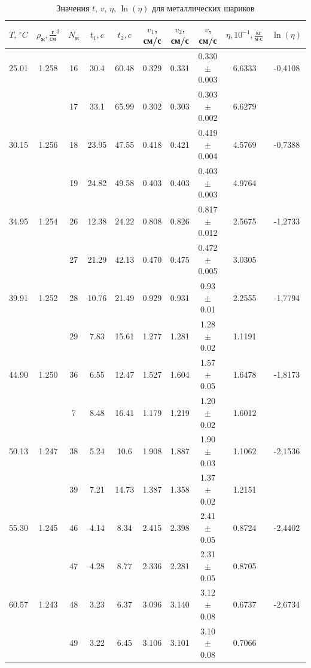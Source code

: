 \documentclass[a4paper,12pt]{article} %
\begin{document}
\begin{enumerate}
	\begin{table}[h!]
		\centering
		\begin{tabular}{|c|c|c|cc|cc|c|c|c|}
			\hline
			$T, \, ^\circ C$ & $\rho_\text{ж}, \frac{\text{г}}{\text{см}}^3$ & $N_{\text{м}}$ & $t_1, c$ & $t_2, c$ & $v_1$, см/с & $v_2$, см/с & $v$, см/с & $\eta, 10^{-1}, \frac{\text{кг}}{\text{м·с}}$ & $\ln(\eta)$ \\
			\hline
			25.01 & 1.258 & 16 & 30.4  & 60.48 & 0.329  & 0.331  & 0.330 $\pm$ 0.003 & 6.6333 & -0,4108 \\
						&      & 17 & 33.1  & 65.99 & 0.302  & 0.303  & 0.303 $\pm$ 0.002 & 6.6279 &        \\
			30.15 & 1.256 & 18 & 23.95 & 47.55 & 0.418  & 0.421  & 0.419 $\pm$ 0.004 & 4.5769 & -0,7388 \\
						&      & 19 & 24.82 & 49.58 & 0.403  & 0.403  & 0.403 $\pm$ 0.003 & 4.9764 &        \\
			34.95 & 1.254 & 26 & 12.38 & 24.22 & 0.808  & 0.826  & 0.817 $\pm$ 0.012 & 2.5675 & -1,2733 \\
						&      & 27 & 21.29 & 42.13 & 0.470  & 0.475  & 0.472 $\pm$ 0.005 & 3.0305 &        \\
			39.91 & 1.252 & 28 & 10.76 & 21.49 & 0.929  & 0.931  & 0.93 $\pm$ 0.01 & 2.2555 & -1,7794 \\
						&      & 29 & 7.83  & 15.61 & 1.277  & 1.281  & 1.28 $\pm$ 0.02 & 1.1191 &        \\
			44.90 & 1.250 & 36 & 6.55  & 12.47 & 1.527  & 1.604  & 1.57 $\pm$ 0.05 & 1.6478 & -1,8173 \\
						&      & 7  & 8.48  & 16.41 & 1.179  & 1.219  & 1.20 $\pm$ 0.02  & 1.6012 &        \\
			50.13 & 1.247 & 38 & 5.24  & 10.6  & 1.908  & 1.887  & 1.90 $\pm$ 0.03 & 1.1062 & -2,1536 \\
						&      & 39 & 7.21  & 14.73 & 1.387  & 1.358  & 1.37 $\pm$ 0.02  & 1.2151 &        \\
			55.30 & 1.245 & 46 & 4.14  & 8.34  & 2.415  & 2.398  & 2.41 $\pm$ 0.05  & 0.8724 & -2,4402 \\
						&      & 47 & 4.28  & 8.77  & 2.336  & 2.281  & 2.31 $\pm$ 0.05  & 0.8705 &        \\
			60.57 & 1.243 & 48 & 3.23  & 6.37  & 3.096  & 3.140  & 3.12 $\pm$ 0.08  & 0.6737 & -2,6734 \\
						&      & 49 & 3.22  & 6.45  & 3.106  & 3.101  & 3.10 $\pm$ 0.08  & 0.7066 &        \\
			\hline
		\end{tabular}
		\caption{Значения $t$, $v$, $\eta$, $\ln(\eta)$ для металлических шариков}
		\label{tab:metal_times}
	\end{table}
  

\end{enumerate}
\end{document}
